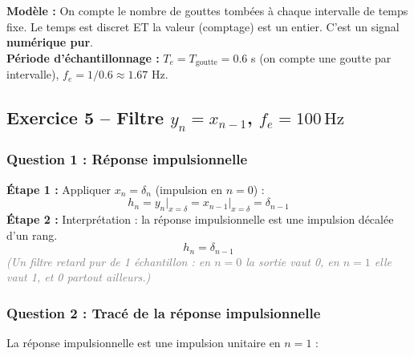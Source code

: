 \documentclass[12pt,a4paper]{article}
\newcommand{\step}[1]{\textcolor{coursbleu}{\textbf{Étape #1 :}}}
\newcommand{\explication}[1]{\textit{\textcolor{gray}{(#1)}}}
\newcommand{\encadre}[1]{\boxed{#1}}
\begin{document}
\begin{tcolorbox}[corrbox, title=Correction Q4]
\textbf{Modèle :} On compte le nombre de gouttes tombées à chaque intervalle de temps fixe.
Le temps est discret ET la valeur (comptage) est un entier.
C'est un signal \textbf{numérique pur}.\\[3pt]
\textbf{Période d'échantillonnage :} $T_e = T_{\text{goutte}} = 0.6$ s (on compte une goutte par intervalle),
$f_e = 1/0.6 \approx 1.67$ Hz.
\end{tcolorbox}

\subsection{Exercice 5 -- Filtre
  \texorpdfstring{$y_n = x_{n-1}$, $f_e = 100\,\text{Hz}$}%
  {yn = x(n-1), fe = 100 Hz}}

\subsubsection*{Question 1 : Réponse impulsionnelle}

\begin{tcolorbox}[corrbox, title=Correction Q1]
\step{1} Appliquer $x_n = \delta_n$ (impulsion en $n=0$) :
\[
  h_n = y_n\Big|_{x=\delta} = x_{n-1}\Big|_{x=\delta} = \delta_{n-1}
\]
\step{2} Interprétation : la réponse impulsionnelle est une impulsion décalée d'un rang.
\[
  \encadre{h_n = \delta_{n-1}}
\]
\explication{Un filtre retard pur de 1 échantillon : en $n=0$ la sortie vaut 0, en $n=1$ elle vaut 1,
et 0 partout ailleurs.}
\end{tcolorbox}

\subsubsection*{Question 2 : Tracé de la réponse impulsionnelle}

La réponse impulsionnelle est une impulsion unitaire en $n=1$ :

\begin{center}
\end{center}
\end{document}
